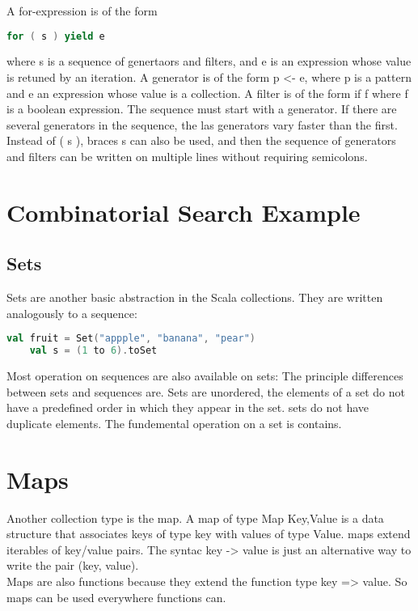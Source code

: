 \documentclass[10pt, a4paper]{report}
\begin{document}
A for-expression is of the form

\begin{lstlisting}[language=scala]
for ( s ) yield e
\end{lstlisting}

where s is a sequence of genertaors and filters, and e is an expression whose value is retuned by an iteration. A generator is of the form p <- e, where p is a pattern and e an expression whose value is a collection. A filter is of the form if f where f is a boolean expression. The sequence must start with a generator. If there are several generators in the sequence, the las generators vary faster than the first.\\

Instead of ( s ), braces s can also be used, and then the sequence of generators and filters can be written on multiple lines without requiring semicolons.

\section{Combinatorial Search Example}

\subsection*{Sets}

Sets are another basic abstraction in the Scala collections. They are written analogously to a sequence: 

\begin{lstlisting}[language=scala]
	val fruit = Set("appple", "banana", "pear")
	val s = (1 to 6).toSet
\end{lstlisting}

Most operation on sequences are also available on sets: The principle differences between sets and sequences are. Sets are unordered, the elements of a set do not have a predefined order in which they appear in the set. sets do not have duplicate elements. The fundemental operation on a set is contains.

\section{Maps}

Another collection type is the map. A map of type Map Key,Value is a data structure that associates keys of type key with values of type Value. maps extend iterables of key/value pairs. The syntac key -> value is just an alternative way to write the pair (key, value).\\ Maps are also functions because they extend the function type key => value. So maps can be used everywhere functions can.\\
\end{document}
